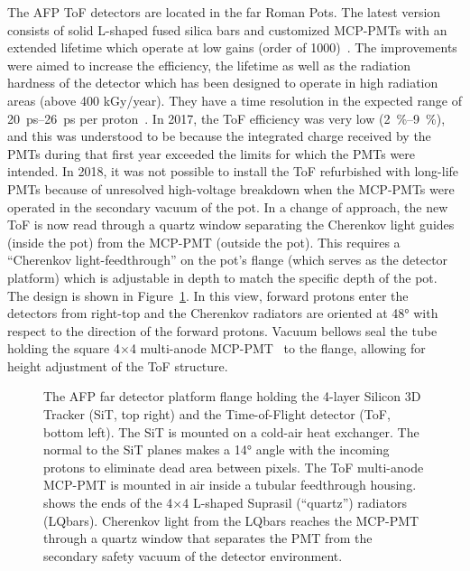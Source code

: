 \documentclass[cernpreprint, atlasdraft=false, UKenglish,british,orcidlogo, texmf, orcidlogo]{atlasdoc}
\begin{document}
The \gls{AFP} \gls{ToF} detectors are located in the far Roman Pots.
The latest version consists of solid L-shaped fused silica bars and customized \glspl{MCP-PMT} with an extended lifetime which operate at low gains (order of 1000)~\cite{Nozka:23}. The improvements were aimed to increase the efficiency, the lifetime as well as the radiation hardness of the detector which has been designed to operate in high radiation areas (above 400 kGy/year).
They have a time resolution in the expected range of \SIrange{20}{26}{\ps} per proton~\cite{Cerny_2019}.
In 2017, the \gls{ToF} efficiency was very low (\SIrange{2}{9}{\percent}), and this was understood to be because the integrated charge received by the \glspl{PMT} during that first year exceeded the limits for which the \glspl{PMT} were intended.
In 2018, it was not possible to install the \gls{ToF} refurbished with long-life \glspl{PMT} because of unresolved
high-voltage breakdown when the \glspl{MCP-PMT} were operated in the secondary vacuum of the pot. In a change of approach, the new \gls{ToF} is now read through a quartz window separating the Cherenkov light guides (inside the pot) from the \gls{MCP-PMT} (outside the pot). This requires a ``Cherenkov light-feedthrough'' on the pot's flange (which serves as the detector platform) which is adjustable in depth to match the specific depth of the pot.
The design is shown in Figure~\ref{fig:NewFlange}.
In this view, forward protons enter the detectors from right-top and the Cherenkov radiators are oriented at \ang{48} with respect to the direction of the forward protons. Vacuum bellows seal the tube holding the square 4$\times$4  multi-anode \gls{MCP-PMT}~\cite{MiniPlanacon} to the flange, allowing for height adjustment of the \gls{ToF} structure.
\begin{figure}[ht!]
\centering
{}
\caption[\gls{AFP} Silicon 3D Tracker and quartz radiators.]{ The \gls{AFP} far detector platform flange holding the 4-layer Silicon 3D Tracker (\gls{SiT}, top right) and the Time-of-Flight detector (\gls{ToF}, bottom left).
The \gls{SiT} is mounted on a cold-air heat exchanger. The normal to the \gls{SiT} planes makes a \ang{14} angle with the incoming protons to eliminate dead area between pixels. The \gls{ToF} multi-anode \gls{MCP-PMT} is mounted in air inside a tubular feedthrough housing.  shows the ends of the 4$\times$4 L-shaped Suprasil (``quartz'') radiators (LQbars). Cherenkov light from the LQbars reaches the \gls{MCP-PMT} through a quartz window that separates the \gls{PMT} from the secondary safety vacuum of the detector environment.}
\label{fig:NewFlange}
\end{figure}
 
\end{document}

